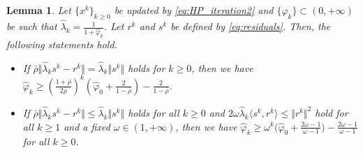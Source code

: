 \documentclass{article}
\theoremstyle{plain}
\newtheorem{lemma}{Lemma}[section]
\theoremstyle{definition}
\newcommand{\sets}[1]{\{#1\}}
\newcommand{\norms}[1]{\Vert#1\Vert}
\newcommand{\iprods}[1]{\langle #1\rangle}
\newcommand{\0}{\boldsymbol{0}}
\begin{document}
\begin{lemma}\label{le:varphi_k_bounds}
Let $\sets{x^k}_{k \geq 0}$ be updated by \eqref{eq:HP_iteration2} and $\sets{\hat{\varphi}_k} \subset (0, +\infty)$ be such that $\hat{\lambda}_k = \frac{1}{1 + \hat{\varphi}_k}$.
Let $r^k$ and $s^k$ be defined by \eqref{eq:residuals}.
Then, the following statements hold.
\begin{itemize}
\item[{\rm(i)}] If $\bar{\rho} \norms{\hat{\lambda}_ks^k - r^k}  = \hat{\lambda}_k\norms{s^k}$ holds for $k \geq 0$, then we have $\hat{\varphi}_k \geq \left(\frac{1 + \bar{\rho}}{2\bar{\rho}}\right)^k\left(\hat{\varphi}_0 + \frac{2}{1 - \bar{\rho}} \right) - \frac{2}{1 - \bar{\rho}}$.

\item[{\rm(ii)}] If $\bar{\rho} \norms{\hat{\lambda}_ks^k - r^k}  \leq \hat{\lambda}_k\norms{s^k}$ holds for all $k \geq 0$ and $2\omega\hat{\lambda}_k\iprods{s^k, r^k} \leq \norms{r^k}^2$ hold for all $k \geq 1$ and a fixed $\omega \in (1, +\infty)$, then we have $\hat{\varphi}_k \geq \omega^k \big(\hat{\varphi}_0 +  \frac{2\omega-1}{\omega - 1}\big) -  \frac{2\omega-1}{\omega - 1}$ for all $k \geq 0$.
\end{itemize}
\end{lemma}
\end{document}
